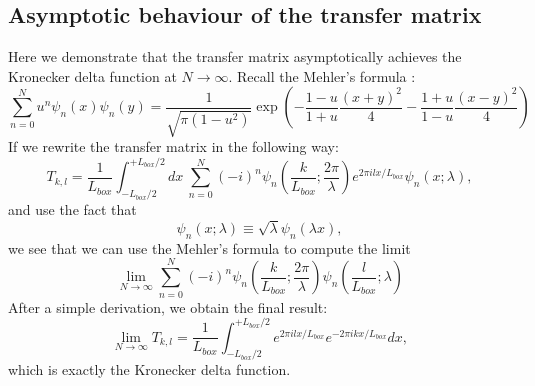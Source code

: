 \subsection{Asymptotic behaviour of the transfer matrix}
Here we demonstrate that the transfer matrix asymptotically  achieves the  Kronecker delta function at $N\rightarrow\infty$.
Recall the Mehler's formula \cite{Mehler1866ueber}:
\begin{equation}
\sum_{n=0}^N u^n \psi_n(x)\psi_n(y)=\frac{1}{\sqrt{\pi(1-u^2)}} \exp \left( -\frac{1-u}{1+u}\frac{(x+y)^2}{4} - \frac{1+u}{1-u}\frac{(x-y)^2}{4} \right)
\end{equation}
If we rewrite the transfer matrix in the following way:
\begin{equation}
T_{k,l} = \frac{1}{L_{box}} \int_{-L_{box}/2}^{+L_{box}/2}dx~ \sum_{n=0}^{N}(-i)^n \psi_{n}(\frac{k}{L_{box}}; \frac{2\pi}{\lambda}) e^{2\pi i l x/L_{box}}\psi_{n}(x; \lambda),
\end{equation}
and use the fact that
\begin{equation}
\psi_{n}(x; \lambda) \equiv \sqrt{\lambda}\psi_{n}(\lambda x),
\end{equation}
we see that we can use the Mehler's formula to compute the limit
\begin{equation}
\lim_{N\rightarrow\infty} \sum_{n=0}^{N} (-i)^n \psi_{n}(\frac{k}{L_{box}}; \frac{2\pi}{\lambda})\psi_{n}(\frac{l}{L_{box}}; \lambda)
\end{equation}
%
After a simple derivation, we obtain the final result:
\begin{equation}
\lim_{N\rightarrow\infty}T_{k,l} = \frac{1}{L_{box}} \int_{-L_{box}/2}^{+L_{box}/2} e^{2\pi i l x/L_{box}} e^{-2\pi i k x/L_{box}} dx,
\end{equation}
which is exactly the Kronecker delta function.


